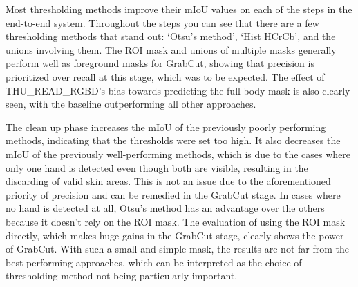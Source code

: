 \documentclass[conference]{IEEEtran}
\begin{document}
Most thresholding methods improve their mIoU values on each of the steps in the end-to-end system. Throughout the steps you can see that there are a few thresholding methods that stand out: `Otsu's method', `Hist HCrCb', and the unions involving them. The ROI mask and unions of multiple masks generally perform well as foreground masks for GrabCut, showing that precision is prioritized over recall at this stage, which was to be expected. The effect of THU\_READ\_RGBD's bias towards predicting the full body mask is also clearly seen, with the baseline outperforming all other approaches.

The clean up phase increases the mIoU of the previously poorly performing methods, indicating that the thresholds were set too high. It also decreases the mIoU of the previously well-performing methods, which is due to the cases where only one hand is detected even though both are visible, resulting in the discarding of valid skin areas. This is not an issue due to the aforementioned priority of precision and can be remedied in the GrabCut stage. In cases where no hand is detected at all, Otsu's method has an advantage over the others because it doesn't rely on the ROI mask. The evaluation of using the ROI mask directly, which makes huge gains in the GrabCut stage, clearly shows the power of GrabCut. With such a small and simple mask, the results are not far from the best performing approaches, which can be interpreted as the choice of thresholding method not being particularly important. 
\end{document}
